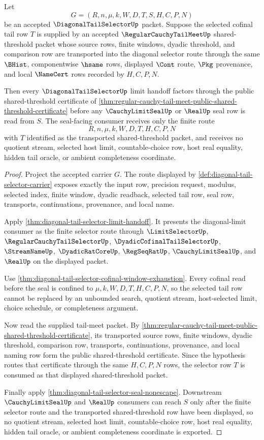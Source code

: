 \begin{theorem}
\label{thm:diagonal-tail-selector-tail-meet-compatibility}
Let
$$
G=(R,n,\mu,k,W,D,T,S,H,C,P,N)
$$
be an accepted $\DiagonalTailSelectorUp$ packet. Suppose the selected cofinal tail row $T$ is supplied by an accepted $\RegularCauchyTailMeetUp$ shared-threshold packet whose source rows, finite windows, dyadic threshold, and comparison row are transported into the diagonal selector route through the same $\BHist$, componentwise $\hsame$ rows, displayed $\Cont$ route, $\Pkg$ provenance, and local $\NameCert$ rows recorded by $H,C,P,N$.

Then every $\DiagonalTailSelectorUp$ limit handoff factors through the public shared-threshold certificate of \autoref{thm:regular-cauchy-tail-meet-public-shared-threshold-certificate} before any $\CauchyLimitSealUp$ or $\RealUp$ seal row is read from $S$. The seal-facing consumer receives only the finite route
$$
R,n,\mu,k,W,D,T,H,C,P,N
$$
with $T$ identified as the transported shared-threshold packet, and receives no quotient stream, selected host limit, countable-choice row, host real equality, hidden tail oracle, or ambient completeness coordinate.
\end{theorem}
\begin{proof}
Project the accepted carrier $G$. The route displayed by \autoref{def:diagonal-tail-selector-carrier} exposes exactly the input row, precision request, modulus, selected index, finite window, dyadic readback, selected tail row, seal row, transports, continuations, provenance, and local name.

Apply \autoref{thm:diagonal-tail-selector-limit-handoff}. It presents the diagonal-limit consumer as the finite selector route through $\LimitSelectorUp$, $\RegularCauchyTailSelectorUp$, $\DyadicCofinalTailSelectorUp$, $\StreamNameUp$, $\DyadicRatCoreUp$, $\RegSeqRatUp$, $\CauchyLimitSealUp$, and $\RealUp$ on the displayed packet.

Use \autoref{thm:diagonal-tail-selector-cofinal-window-exhaustion}. Every cofinal read before the seal is confined to $\mu,k,W,D,T,H,C,P,N$, so the selected tail row cannot be replaced by an unbounded search, quotient stream, host-selected limit, choice schedule, or completeness argument.

Now read the supplied tail-meet packet. By \autoref{thm:regular-cauchy-tail-meet-public-shared-threshold-certificate}, its transported source rows, finite windows, dyadic threshold, comparison row, transports, continuations, provenance, and local naming row form the public shared-threshold certificate. Since the hypothesis routes that certificate through the same $H,C,P,N$ rows, the selector row $T$ is consumed as that displayed shared-threshold packet.

Finally apply \autoref{thm:diagonal-tail-selector-seal-nonescape}. Downstream $\CauchyLimitSealUp$ and $\RealUp$ consumers can reach $S$ only after the finite selector route and the transported shared-threshold row have been displayed, so no quotient stream, selected host limit, countable-choice row, host real equality, hidden tail oracle, or ambient completeness coordinate is exported.
\end{proof}

